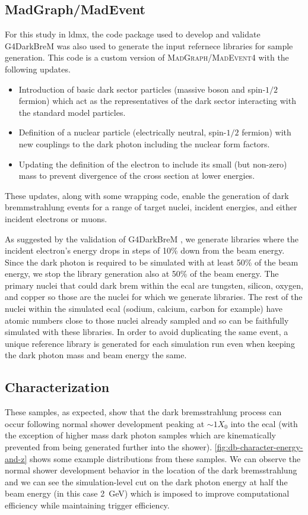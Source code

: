 \subsection{MadGraph/MadEvent}
For this study in \ac{ldmx}, the code package used to develop and validate G4DarkBreM was also used
to generate the input refernece libraries for sample generation. This code is a custom version of
\textsc{MadGraph/MadEvent4} with the following updates.
\begin{itemize}
  \item Introduction of basic dark sector particles (massive boson and spin-$1/2$ fermion) which act as the
        representatives of the dark sector interacting with the standard model particles.
  \item Definition of a nuclear particle (electrically neutral, spin-$1/2$ fermion) with new couplings to
        the dark photon including the nuclear form factors.
  \item Updating the definition of the electron to include its small (but non-zero) mass to prevent
        divergence of the cross section at lower energies.
\end{itemize}
These updates, along with some wrapping code, enable the generation of
dark bremmstrahlung events for a range of target nuclei, incident energies,
and either incident electrons or muons.

As suggested by the validation of G4DarkBreM \cite{g4darkbrem}, we generate libraries where the
incident electron's energy drops in steps of 10\% down from the beam energy. Since the dark photon
is required to be simulated with at least 50\% of the beam energy, we stop the library generation
also at 50\% of the beam energy. The primary nuclei that could dark brem within the \ac{ecal} are
tungsten, silicon, oxygen, and copper so those are the nuclei for which we generate libraries. The
rest of the nuclei within the simulated \ac{ecal} (sodium, calcium, carbon for example) have atomic
numbers close to those nuclei already sampled and so can be faithfully simulated with these
libraries. In order to avoid duplicating the same event, a unique reference library is generated
for each simulation run even when keeping the dark photon mass and beam energy the same.

\subsection{Characterization}
These samples, as expected, show that the dark bremsstrahlung process can occur following
normal shower development peaking at $\sim 1 X_0$ into the \ac{ecal} (with the exception of
higher mass dark photon samples which are kinematically prevented from being generated further
into the shower).
\cref{fig:db-character-energy-and-z} shows some example distributions from these samples.
We can observe the normal shower development behavior in the location of the dark bremsstrahlung
and we can see the simulation-level cut on the dark photon energy at half the beam energy
(in this case \qty{2}{\giga\electronvolt}) which is imposed to improve computational efficiency
while maintaining trigger efficiency.

